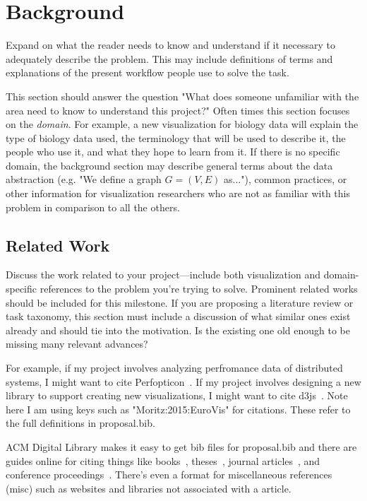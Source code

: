 \section{Background}
\label{sec:background}

Expand on what the reader needs to know and understand if it necessary to
adequately describe the problem. This may include definitions of terms and
explanations of the present workflow people use to solve the task.

This section should answer the question "What does someone unfamiliar with the
area need to know to understand this project?" Often times this section
focuses on the \textit{domain}. For example, a new visualization for biology
data will explain the type of biology data used, the terminology that will be
used to describe it, the people who use it, and what they hope to learn from
it. If there is no specific domain, the background section may describe
general terms about the data abstraction (e.g. "We define a graph $G = (V, E)$
as..."), common practices, or other information for visualization researchers
who are not as familiar with this problem in comparison to all the others. 

\subsection{Related Work}
\label{sec:related}

Discuss the work related to your project---include both visualization and
domain-specific references to the problem you're trying to solve. Prominent
related works should be included for this milestone. If you are proposing a
literature review or task taxonomy, this section must include a discussion of
what similar ones exist already and should tie into the motivation. Is the
existing one old enough to be missing many relevant advances?

For example, if my project involves analyzing perfromance data of distributed
systems, I might want to cite Perfopticon~\cite{Moritz:2015:EuroVis}. If my
project involves designing a new library to support creating new
visualizations, I might want to cite d3js~\cite{d3js}. Note here I am using
keys such as "Moritz:2015:EuroVis" for citations. These refer to the full
definitions in proposal.bib.

ACM Digital Library makes it easy to get bib files for proposal.bib and there
are guides online for citing things like books~\cite{ware:2004:IVP},
theses~\cite{levoy:1989:DSV}, journal articles~\cite{Lorensen:1987:MCA}, and
conference proceedings~\cite{Nielson:1991:TAD}. There's even a format for
miscellaneous references (misc) such as websites and libraries not associated
with a article.

